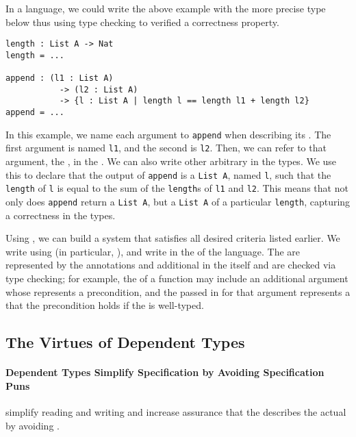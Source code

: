 In a   language, we could write the
above example with the more precise type below thus using type checking to
verified a correctness property.
\begin{verbatim}
length : List A -> Nat
length = ...

append : (l1 : List A)
           -> (l2 : List A)
           -> {l : List A | length l == length l1 + length l2}
append = ...
\end{verbatim}
In this example, we name each argument to \texttt{append} when
describing its .
The first argument is named \texttt{l1}, and the second is \texttt{l2}.
Then, we can refer to that argument, the , in the .
We can also write other arbitrary  in the types.
We use this to declare that the output of \texttt{append} is a
\texttt{List A}, named \texttt{l}, such that the
\texttt{length} of \texttt{l} is equal to the sum of the
\texttt{length}s of \texttt{l1} and \texttt{l2}.
This means that not only does \texttt{append} return a
\texttt{List A}, but a \texttt{List A} of a particular
\texttt{length}, capturing a correctness  in the
types.

Using , we can build a  system
that satisfies all desired criteria listed earlier.
We write  using  (in particular,
), and write  in the  of
the  language.
The  are represented by the annotations and additional 
in the  itself and are checked via type checking; for example,
the  of a function may include an additional argument whose
 represents a precondition, and the  passed in for that
argument represents a  that the precondition holds if the
 is well-typed.

\subsection{The Virtues of Dependent Types}

\paragraph{Dependent Types Simplify Specification by Avoiding Specification Puns}
 simplify reading and writing  and
increase assurance that the  describes the actual
 by avoiding \emph{}.

